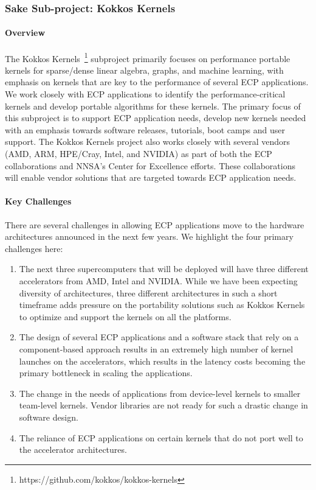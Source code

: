 \subsubsection{ Sake Sub-project: Kokkos Kernels} \label{subsubsect:kokkoskernels}
\paragraph{Overview} 
The Kokkos Kernels~\footnote{https://github.com/kokkos/kokkos-kernels} subproject primarily focuses on performance portable kernels
for sparse/dense linear algebra, graphs, and machine learning, with emphasis on
kernels that are key to the performance of
several ECP applications. We work closely with ECP applications to identify the
performance-critical kernels and develop portable algorithms for these kernels.
The primary focus of this subproject is to support ECP application needs, develop new
kernels needed with an emphasis towards software releases, tutorials, boot camps
and user support. The Kokkos Kernels project also works closely with several vendors
(AMD, ARM, HPE/Cray, Intel, and NVIDIA) as part of both the ECP collaborations and
NNSA's Center for Excellence efforts. These collaborations will  enable vendor solutions
that are targeted towards ECP application needs.

\paragraph{Key  Challenges}
There are several challenges in allowing ECP applications move to the hardware architectures
announced in the next few years. We highlight the four primary challenges here:
\begin{enumerate}
\item 
The next three supercomputers that will be deployed will have
three different accelerators from AMD, Intel and NVIDIA. While we have been expecting diversity of architectures, three
different architectures in such a short timeframe adds pressure on the portability
solutions such as Kokkos Kernels to optimize and support the kernels on all the platforms.
\item
The design of several ECP applications and a software stack that rely on a component-based
approach results in an extremely high number of kernel launches on the accelerators, which
results in the latency costs becoming the primary bottleneck in scaling the applications.
\item
The change in the needs of applications from device-level kernels to smaller team-level kernels. Vendor
libraries are not ready for such a drastic change in software design.
\item 
The reliance of ECP applications on certain kernels that do not port well to the  accelerator architectures.
\end{enumerate}


